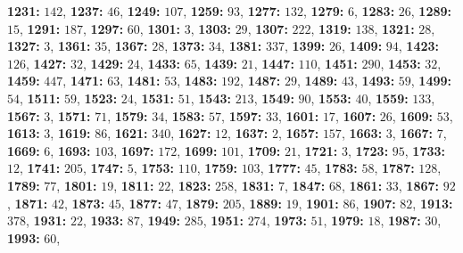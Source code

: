 \textsf{\bfseries 1231:} $142$, \textsf{\bfseries 1237:} $46$, \textsf{\bfseries 1249:} $107$, \textsf{\bfseries 1259:} $93$, \textsf{\bfseries 1277:} $132$, \textsf{\bfseries 1279:} $6$, \textsf{\bfseries 1283:} $26$, \textsf{\bfseries 1289:} $15$, \textsf{\bfseries 1291:} $187$, \textsf{\bfseries 1297:} $60$, \textsf{\bfseries 1301:} $3$, \textsf{\bfseries 1303:} $29$, \textsf{\bfseries 1307:} $222$, \textsf{\bfseries 1319:} $138$, \textsf{\bfseries 1321:} $28$, \textsf{\bfseries 1327:} $3$, \textsf{\bfseries 1361:} $35$, \textsf{\bfseries 1367:} $28$, \textsf{\bfseries 1373:} $34$, \textsf{\bfseries 1381:} $337$, \textsf{\bfseries 1399:} $26$, \textsf{\bfseries 1409:} $94$, \textsf{\bfseries 1423:} $126$, \textsf{\bfseries 1427:} $32$, \textsf{\bfseries 1429:} $24$, \textsf{\bfseries 1433:} $65$, \textsf{\bfseries 1439:} $21$, \textsf{\bfseries 1447:} $110$, \textsf{\bfseries 1451:} $290$, \textsf{\bfseries 1453:} $32$, \textsf{\bfseries 1459:} $447$, \textsf{\bfseries 1471:} $63$, \textsf{\bfseries 1481:} $53$, \textsf{\bfseries 1483:} $192$, \textsf{\bfseries 1487:} $29$, \textsf{\bfseries 1489:} $43$, \textsf{\bfseries 1493:} $59$, \textsf{\bfseries 1499:} $54$, \textsf{\bfseries 1511:} $59$, \textsf{\bfseries 1523:} $24$, \textsf{\bfseries 1531:} $51$, \textsf{\bfseries 1543:} $213$, \textsf{\bfseries 1549:} $90$, \textsf{\bfseries 1553:} $40$, \textsf{\bfseries 1559:} $133$, \textsf{\bfseries 1567:} $3$, \textsf{\bfseries 1571:} $71$, \textsf{\bfseries 1579:} $34$, \textsf{\bfseries 1583:} $57$, \textsf{\bfseries 1597:} $33$, \textsf{\bfseries 1601:} $17$, \textsf{\bfseries 1607:} $26$, \textsf{\bfseries 1609:} $53$, \textsf{\bfseries 1613:} $3$, \textsf{\bfseries 1619:} $86$, \textsf{\bfseries 1621:} $340$, \textsf{\bfseries 1627:} $12$, \textsf{\bfseries 1637:} $2$, \textsf{\bfseries 1657:} $157$, \textsf{\bfseries 1663:} $3$, \textsf{\bfseries 1667:} $7$, \textsf{\bfseries 1669:} $6$, \textsf{\bfseries 1693:} $103$, \textsf{\bfseries 1697:} $172$, \textsf{\bfseries 1699:} $101$, \textsf{\bfseries 1709:} $21$, \textsf{\bfseries 1721:} $3$, \textsf{\bfseries 1723:} $95$, \textsf{\bfseries 1733:} $12$, \textsf{\bfseries 1741:} $205$, \textsf{\bfseries 1747:} $5$, \textsf{\bfseries 1753:} $110$, \textsf{\bfseries 1759:} $103$, \textsf{\bfseries 1777:} $45$, \textsf{\bfseries 1783:} $58$, \textsf{\bfseries 1787:} $128$, \textsf{\bfseries 1789:} $77$, \textsf{\bfseries 1801:} $19$, \textsf{\bfseries 1811:} $22$, \textsf{\bfseries 1823:} $258$, \textsf{\bfseries 1831:} $7$, \textsf{\bfseries 1847:} $68$, \textsf{\bfseries 1861:} $33$, \textsf{\bfseries 1867:} $92$, \textsf{\bfseries 1871:} $42$, \textsf{\bfseries 1873:} $45$, \textsf{\bfseries 1877:} $47$, \textsf{\bfseries 1879:} $205$, \textsf{\bfseries 1889:} $19$, \textsf{\bfseries 1901:} $86$, \textsf{\bfseries 1907:} $82$, \textsf{\bfseries 1913:} $378$, \textsf{\bfseries 1931:} $22$, \textsf{\bfseries 1933:} $87$, \textsf{\bfseries 1949:} $285$, \textsf{\bfseries 1951:} $274$, \textsf{\bfseries 1973:} $51$, \textsf{\bfseries 1979:} $18$, \textsf{\bfseries 1987:} $30$, \textsf{\bfseries 1993:} $60$, 
